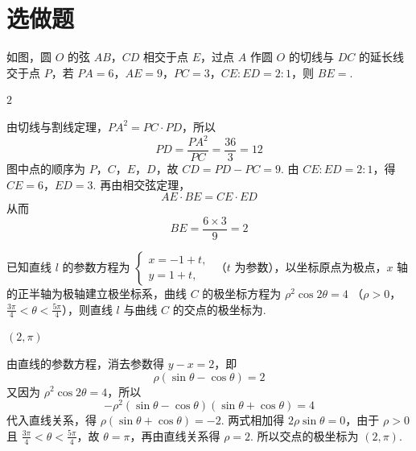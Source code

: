 \section{选做题}

\begin{problem}
如图，圆 \(O\) 的弦 \(AB\)，\(CD\) 相交于点 \(E\)，过点 \(A\) 作圆 \(O\) 的切线与 \(DC\) 的延长线交于点 \(P\)，若 \(PA = 6\)，\(AE = 9\)，\(PC = 3\)，\(CE:ED = 2:1\)，则 \(BE = \)\fillinblank{}.


\begin{answer}
\(2\)
\end{answer}

\begin{solution}
由切线与割线定理，\(PA^2=PC\cdot PD\)，所以
\[
PD=\frac{PA^2}{PC}=\frac{36}{3}=12
\]
图中点的顺序为 \(P\)，\(C\)，\(E\)，\(D\)，故 \(CD=PD-PC=9\). 由 \(CE:ED=2:1\)，得 \(CE=6\)，\(ED=3\). 再由相交弦定理，
\[
AE\cdot BE=CE\cdot ED
\]
从而
\[
BE=\frac{6\times3}{9}=2
\]
\end{solution}
\end{problem}

\begin{problem}
已知直线 \(l\) 的参数方程为 \(\begin{cases}
x = -1 + t,\\
y = 1 + t,
\end{cases}\) （\(t\) 为参数），以坐标原点为极点，\(x\) 轴的正半轴为极轴建立极坐标系，曲线 \(C\) 的极坐标方程为 \(\rho^2 \cos 2\theta = 4\) （\(\rho > 0\)，\(\frac{3\pi}{4} < \theta < \frac{5\pi}{4}\)），则直线 \(l\) 与曲线 \(C\) 的交点的极坐标为\fillinblank{}.

\begin{answer}
\((2,\pi)\)
\end{answer}

\begin{solution}
由直线的参数方程，消去参数得 \(y-x=2\)，即
\[
\rho(\sin\theta-\cos\theta)=2
\]
又因为 \(\rho^2\cos2\theta=4\)，所以
\[
-\rho^2(\sin\theta-\cos\theta)(\sin\theta+\cos\theta)=4
\]
代入直线关系，得 \(\rho(\sin\theta+\cos\theta)=-2\). 两式相加得 \(2\rho\sin\theta=0\)，由于 \(\rho>0\) 且 \(\frac{3\pi}{4}<\theta<\frac{5\pi}{4}\)，故 \(\theta=\pi\)，再由直线关系得 \(\rho=2\). 所以交点的极坐标为 \((2,\pi)\).
\end{solution}
\end{problem}

